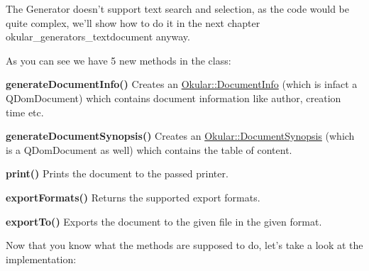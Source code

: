 The Generator doesn't support text search and selection, as the code would be quite complex, we'll show how to do it in the next chapter okular\+\_\+generators\+\_\+textdocument anyway.

As you can see we have 5 new methods in the class\+:

\begin{DoxyItemize}
\item {\bfseries generate\+Document\+Info()} Creates an \hyperlink{classOkular_1_1DocumentInfo}{Okular\+::\+Document\+Info} (which is infact a Q\+Dom\+Document) which contains document information like author, creation time etc. \item {\bfseries generate\+Document\+Synopsis()} Creates an \hyperlink{classOkular_1_1DocumentSynopsis}{Okular\+::\+Document\+Synopsis} (which is a Q\+Dom\+Document as well) which contains the table of content. \item {\bfseries print()} Prints the document to the passed printer. \item {\bfseries export\+Formats()} Returns the supported export formats. \item {\bfseries export\+To()} Exports the document to the given file in the given format.\end{DoxyItemize}
Now that you know what the methods are supposed to do, let's take a look at the implementation\+:


